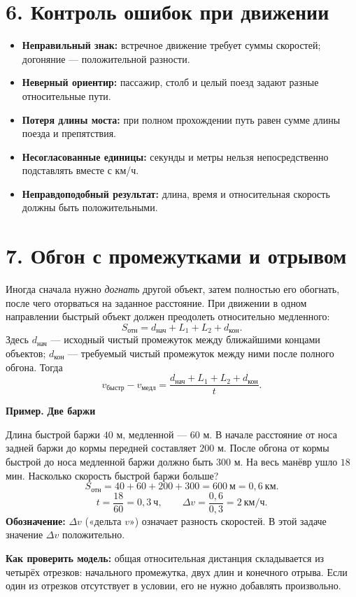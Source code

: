\documentclass[a4paper,12pt]{article}
\newcommand{\key}[1]{\textcolor{darkaccent}{\textbf{#1}}}
\newcommand{\ex}[1]{\par\smallskip\noindent\key{Пример.} \textbf{#1}\par\smallskip}
\begin{document}
\section*{6. Контроль ошибок при движении}
\begin{itemize}
\item \key{Неправильный знак:} встречное движение требует суммы скоростей; догоняние --- положительной разности.
\item \key{Неверный ориентир:} пассажир, столб и целый поезд задают разные относительные пути.
\item \key{Потеря длины моста:} при полном прохождении путь равен сумме длины поезда и препятствия.
\item \key{Несогласованные единицы:} секунды и метры нельзя непосредственно подставлять вместе с км/ч.
\item \key{Неправдоподобный результат:} длина, время и относительная скорость должны быть положительными.
\end{itemize}

\clearpage
\section*{7. Обгон с промежутками и отрывом}
Иногда сначала нужно \emph{догнать} другой объект, затем полностью его обогнать, после чего оторваться на заданное расстояние. При движении в одном направлении быстрый объект должен преодолеть относительно медленного:
\[
\boxed{\displaystyle S_{\text{отн}}=d_{\text{нач}}+L_1+L_2+d_{\text{кон}}.}
\]
Здесь $d_{\text{нач}}$ --- исходный чистый промежуток между ближайшими концами объектов; $d_{\text{кон}}$ --- требуемый чистый промежуток между ними после полного обгона. Тогда
\[
\boxed{\displaystyle v_{\text{быстр}}-v_{\text{медл}}
=\frac{d_{\text{нач}}+L_1+L_2+d_{\text{кон}}}{t}.}
\]

\ex{Две баржи}
Длина быстрой баржи $40$ м, медленной --- $60$ м. В начале расстояние от носа задней баржи до кормы передней составляет $200$ м. После обгона от кормы быстрой до носа медленной баржи должно быть $300$ м. На весь манёвр ушло $18$ мин. Насколько скорость быстрой баржи больше?
\[
S_{\text{отн}}=40+60+200+300=600\ \text{м}=0{,}6\ \text{км}.
\]
\[
t=\frac{18}{60}=0{,}3\ \text{ч},\qquad
\Delta v=\frac{0{,}6}{0{,}3}=\boxed{2\ \text{км/ч}}.
\]
\key{Обозначение:} $\Delta v$ («дельта $v$») означает разность скоростей. В этой задаче значение $\Delta v$ положительно.

\key{Как проверить модель:} общая относительная дистанция складывается из четырёх отрезков: начального промежутка, двух длин и конечного отрыва. Если один из отрезков отсутствует в условии, его не нужно добавлять произвольно.
\end{document}
